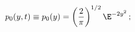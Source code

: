 \begin{equation}
p_0(y,t) \equiv p_0(y) = \left( {2\over\pi} \right)^{1/2} \E^{-2y^2} \, ;
\label{eq17}
\end{equation}

